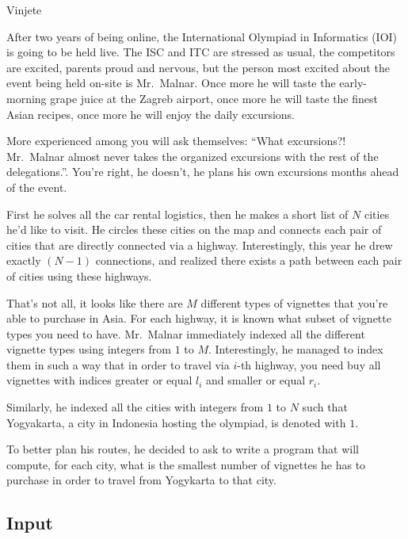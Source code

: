 \begin{statement}[
  problempoints=100,
  timelimit=3 seconds,
  memorylimit=512 MiB,
]{Vinjete}

After two years of being online, the International Olympiad in Informatics
(IOI) is going to be held live. The ISC and ITC are stressed as usual, the
competitors are excited, parents proud and nervous, but the person most
excited about the event being held on-site is Mr.\ Malnar. Once more he will
taste the early-morning grape juice at the Zagreb airport, once more he will
taste the finest Asian recipes, once more he will enjoy the daily excursions.

More experienced among you will ask themselves: ``What excursions?! Mr.\ Malnar
almost never takes the organized excursions with the rest of the delegations.''.
You're right, he doesn't, he plans his own excursions months ahead of the event.

First he solves all the car rental logistics, then he makes a short list of $N$
cities he'd like to visit. He circles these cities on the map and connects each
pair of cities that are directly connected via a highway. Interestingly, this
year he drew exactly $(N-1)$ connections, and realized there exists a path
between each pair of cities using these highways.

That's not all, it looks like there are $M$ different types of vignettes that
you're able to purchase in Asia. For each highway, it is known what subset of
vignette types you need to have. Mr.\ Malnar immediately indexed all the
different vignette types using integers from $1$ to $M$. Interestingly, he
managed to index them in such a way that in order to travel via $i$-th
highway, you need buy all vignettes with indices greater or equal $l_i$ and
smaller or equal $r_i$.

Similarly, he indexed all the cities with integers from $1$ to $N$ such that
Yogyakarta, a city in Indonesia hosting the olympiad, is denoted with $1$.

To better plan his routes, he decided to ask to write a program that will
compute, for each city, what is the smallest number of vignettes he has
to purchase in order to travel from Yogykarta to that city.

\subsection*{Input}


\end{statement}
